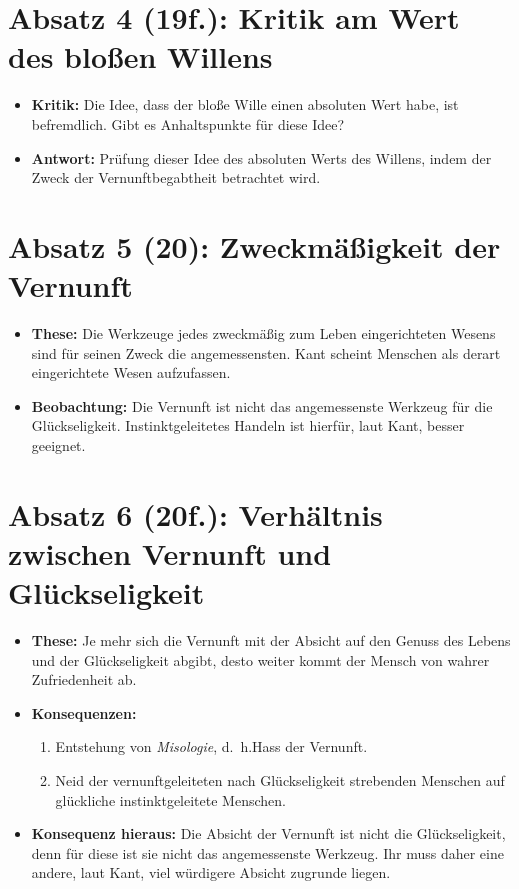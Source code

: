 \documentclass{llncs}
\begin{document}
\section*{Absatz 4 (19f.): Kritik am Wert des bloßen Willens}

\begin{itemize}
    \item \textbf{Kritik:} Die Idee, dass der bloße Wille einen absoluten Wert habe, ist befremdlich.
		Gibt es Anhaltspunkte für diese Idee?
	\item \textbf{Antwort:} Prüfung dieser Idee des absoluten Werts des Willens, indem der Zweck der Vernunftbegabtheit betrachtet wird.
\end{itemize}

\section*{Absatz 5 (20): Zweckmäßigkeit der Vernunft}

\begin{itemize}
    \item \textbf{These:} Die Werkzeuge jedes zweckmäßig zum Leben eingerichteten Wesens sind für seinen Zweck die angemessensten.
		Kant scheint Menschen als derart eingerichtete Wesen aufzufassen.
	\item \textbf{Beobachtung:} Die Vernunft ist nicht das angemessenste Werkzeug für die Glückseligkeit.
		Instinktgeleitetes Handeln ist hierfür, laut Kant, besser geeignet.
\end{itemize}

\section*{Absatz 6 (20f.): Verhältnis zwischen Vernunft und Glückseligkeit}

\begin{itemize}
	\item \textbf{These:} Je mehr sich die Vernunft mit der Absicht auf den Genuss des Lebens und der Glückseligkeit abgibt, desto weiter kommt der Mensch von wahrer Zufriedenheit ab.
	\item \textbf{Konsequenzen:}
		\begin{enumerate}
			\item Entstehung von \textit{Misologie}, d.~h.\@ Hass der Vernunft.
			\item Neid der vernunftgeleiteten nach Glückseligkeit strebenden Menschen auf glückliche instinktgeleitete Menschen.
		\end{enumerate}
	\item \textbf{Konsequenz hieraus:} Die Absicht der Vernunft ist nicht die Glückseligkeit, denn für diese ist sie nicht das angemessenste Werkzeug.
		Ihr muss daher eine andere, laut Kant, viel würdigere Absicht zugrunde liegen.
\end{itemize}
\end{document}
